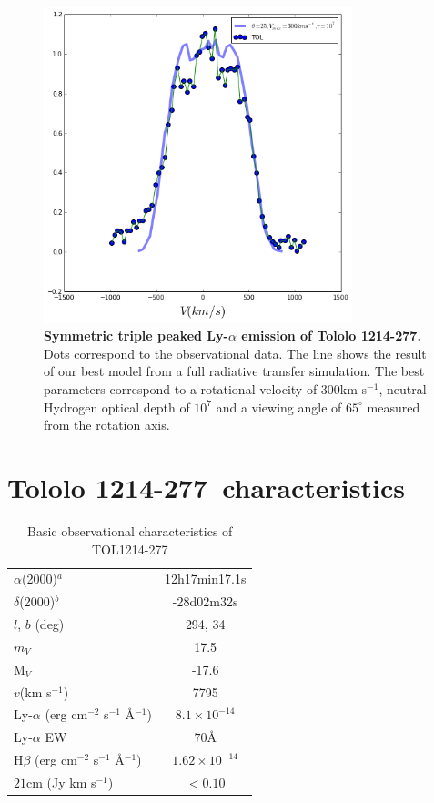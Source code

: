\documentclass[a4paper, usenatbib, 12pt]{article}
\newcommand{\tol}{Tololo 1214-277}
\begin{document}
{\begin{figure}
\begin{center}
\includegraphics[width=0.8\textwidth]{tolfit.png}
\caption{{\bf Symmetric triple peaked Ly-$\alpha$ emission of \tol.}
  Dots correspond to the observational data. The line shows the result
of our best model from a full radiative transfer simulation. The best
parameters correspond to a rotational velocity of $300$km s$^{-1}$,
neutral Hydrogen optical depth of $10^{7}$ and a viewing angle of
$65^{\circ}$ measured from the rotation axis.} 
\end{center}
\end{figure}

{}


\newpage 

\section*{\tol\ characteristics}


\begin{table}
\begin{center}
\begin{tabular}{lc}
$\alpha$(2000)$^{a}$ & 12h17min17.1s\\
$\delta$(2000)$^{b}$ & -28d02m32s\\
$l$, $b$ (deg) & 294, 34\\
$m_V$ & 17.5\\
M$_V$ & -17.6\\ 
$v$(km s$^{-1}$) & 7795\\
Ly-$\alpha$ (erg cm$^{-2}$ s$^{-1}$ \AA$^{-1}$)& $8.1\times 10^{-14}$ \\
Ly-$\alpha$ EW & $70$\AA\\
H$\beta$ (erg cm$^{-2}$ s$^{-1}$ \AA$^{-1}$) & $1.62\times 10^{-14}$ \\
$21$cm (Jy km s$^{-1}$)& $<0.10$ \\
\end{tabular}
\end{center}
\caption{Basic observational characteristics of TOL1214-277
  \cite{Thuan97}\\} 
\end{table}



}
\end{document}
